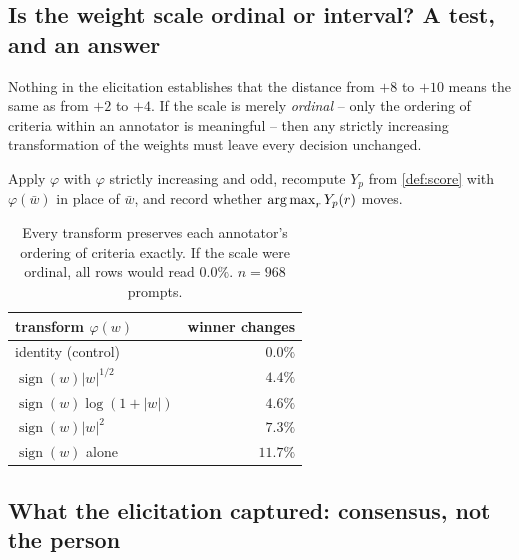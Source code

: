 \subsection{Is the weight scale ordinal or interval? A test, and an answer}
\label{sec:cardinal}

Nothing in the elicitation establishes that the distance from $+8$ to $+10$ means
the same as from $+2$ to $+4$. If the scale is merely \emph{ordinal} -- only the
ordering of criteria within an annotator is meaningful -- then any strictly
increasing transformation of the weights must leave every decision unchanged.

\begin{protocol}
Apply $\varphi$ with $\varphi$ strictly increasing and odd, recompute
$Y_p$ from \cref{def:score} with $\varphi(\bar w)$ in place of $\bar w$, and
record whether $\operatorname*{arg\,max}_r Y_p(r)$ moves.
\end{protocol}

\begin{table}[H]\centering\small
\begin{tabular}{lr}
\toprule
transform $\varphi(w)$ & winner changes \\
\midrule
identity (control) & $0.0\%$ \\
$\operatorname{sign}(w)|w|^{1/2}$ & $4.4\%$ \\
$\operatorname{sign}(w)\log(1+|w|)$ & $4.6\%$ \\
$\operatorname{sign}(w)|w|^{2}$ & $7.3\%$ \\
$\operatorname{sign}(w)$ alone & $\mathbf{11.7\%}$ \\
\bottomrule
\end{tabular}
\caption{Every transform preserves each annotator's ordering of criteria exactly.
If the scale were ordinal, all rows would read $0.0\%$. $n = 968$ prompts.}
\label{tab:cardinal}
\end{table}


\subsection{What the elicitation captured: consensus, not the person}

